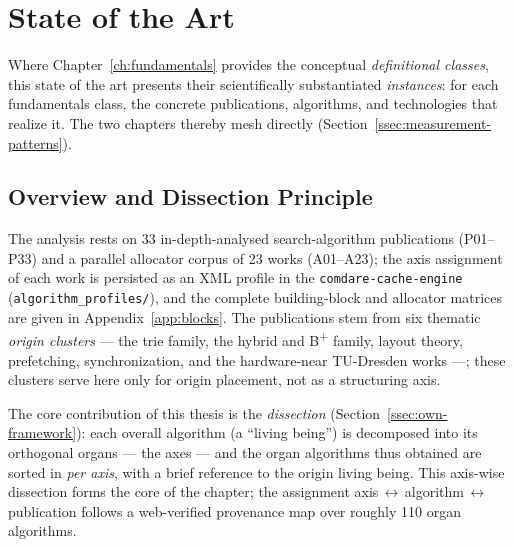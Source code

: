 \chapter{State of the Art}\label{ch:sota}

Where Chapter~\ref{ch:fundamentals} provides the conceptual \emph{definitional classes}, this state
of the art presents their scientifically substantiated \emph{instances}: for each fundamentals
class, the concrete publications, algorithms, and technologies that realize it. The two chapters
thereby mesh directly (Section~\ref{ssec:measurement-patterns}).

\section{Overview and Dissection Principle}\label{sec:sota-overview}
The analysis rests on 33 in-depth-analysed search-algorithm publications (P01--P33) and a parallel
allocator corpus of 23 works (A01--A23); the axis assignment of each work is persisted as an XML
profile in the \texttt{comdare-cache-engine} (\texttt{algorithm\_profiles/}), and the complete
building-block and allocator matrices are given in Appendix~\ref{app:blocks}. The publications stem
from six thematic \emph{origin clusters} --- the trie family, the hybrid and B\textsuperscript{+}
family, layout theory, prefetching, synchronization, and the hardware-near TU-Dresden works ---;
these clusters serve here only for origin placement, not as a structuring axis.

The core contribution of this thesis is the \emph{dissection} (Section~\ref{ssec:own-framework}):
each overall algorithm (a ``living being'') is decomposed into its orthogonal organs --- the axes
--- and the organ algorithms thus obtained are sorted in \emph{per axis}, with a brief reference to
the origin living being. This axis-wise dissection forms the core of the chapter; the assignment
axis\,$\leftrightarrow$\,algorithm\,$\leftrightarrow$\,publication follows a web-verified provenance
map over roughly 110 organ algorithms.

